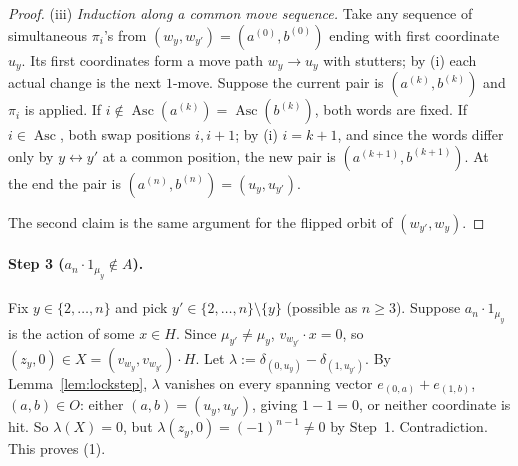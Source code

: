 \documentclass[11pt]{amsart}
\newcommand{\Asc}{\operatorname{Asc}}
\theoremstyle{plain}
\theoremstyle{definition}
\begin{document}
\begin{proof}
(iii) \emph{Induction along a common move sequence.} Take any sequence of simultaneous $\pi_i$'s from $(w_y,w_{y'})=(a^{(0)},b^{(0)})$ ending with first coordinate $u_y$. Its first coordinates form a move path $w_y\to u_y$ with stutters; by (i) each actual change is the next $1$-move. Suppose the current pair is $(a^{(k)},b^{(k)})$ and $\pi_i$ is applied. If $i\notin\Asc(a^{(k)})=\Asc(b^{(k)})$, both words are fixed. If $i\in\Asc$, both swap positions $i,i+1$; by (i) $i=k+1$, and since the words differ only by $y\leftrightarrow y'$ at a common position, the new pair is $(a^{(k+1)},b^{(k+1)})$. At the end the pair is $(a^{(n)},b^{(n)})=(u_y,u_{y'})$.

The second claim is the same argument for the flipped orbit of $(w_{y'},w_y)$.
\end{proof}

\paragraph{Step 3 ($a_n\cdot1_{\mu_y}\notin A$).} Fix $y\in\{2,\dots,n\}$ and pick $y'\in\{2,\dots,n\}\setminus\{y\}$ (possible as $n\ge3$). Suppose $a_n\cdot1_{\mu_y}$ is the action of some $x\in H$. Since $\mu_{y'}\ne\mu_y$, $v_{w_{y'}}\cdot x=0$, so $(z_y,0)\in X=(v_{w_y},v_{w_{y'}})\cdot H$. Let $\lambda:=\delta_{(0,u_y)}-\delta_{(1,u_{y'})}$. By Lemma~\ref{lem:lockstep}, $\lambda$ vanishes on every spanning vector $e_{(0,a)}+e_{(1,b)}$, $(a,b)\in O$: either $(a,b)=(u_y,u_{y'})$, giving $1-1=0$, or neither coordinate is hit. So $\lambda(X)=0$, but $\lambda(z_y,0)=(-1)^{n-1}\ne0$ by Step~1. Contradiction. This proves (1).
\end{document}
